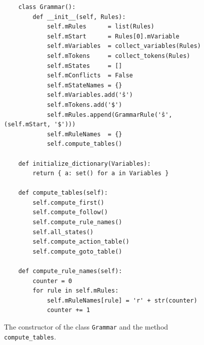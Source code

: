 \begin{figure}[!ht]
\centering
\begin{verbatim}
    class Grammar():
        def __init__(self, Rules):
            self.mRules      = list(Rules)
            self.mStart      = Rules[0].mVariable
            self.mVariables  = collect_variables(Rules)
            self.mTokens     = collect_tokens(Rules)
            self.mStates     = []
            self.mConflicts  = False
            self.mStateNames = {}
            self.mVariables.add('ŝ')
            self.mTokens.add('$')
            self.mRules.append(GrammarRule('ŝ', (self.mStart, '$')))
            self.mRuleNames  = {}
            self.compute_tables()

    def initialize_dictionary(Variables):
        return { a: set() for a in Variables }

    def compute_tables(self):
        self.compute_first()
        self.compute_follow()
        self.compute_rule_names()
        self.all_states()
        self.compute_action_table()
        self.compute_goto_table()

    def compute_rule_names(self):
        counter = 0
        for rule in self.mRules:
            self.mRuleNames[rule] = 'r' + str(counter)
            counter += 1
\end{verbatim}
\vspace*{-0.3cm}
\caption{The constructor of the class \texttt{Grammar} and the method \texttt{compute\_tables}.}
\label{fig:04-SLR-Table-Generator.ipynb:Grammar}
\end{figure}

